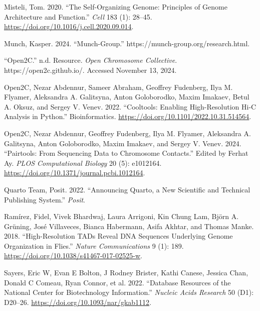 \documentclass[
  11pt,
  a4paper,
]{scrbook}
\newlength{\cslhangindent}
\newenvironment{CSLReferences}[2] %
 {\begin{list}{}{%
  \setlength{\itemindent}{0pt}
  \setlength{\leftmargin}{0pt}
  \setlength{\parsep}{0pt}
  \ifodd #1
   \setlength{\leftmargin}{\cslhangindent}
   \setlength{\itemindent}{-1\cslhangindent}
  \fi
  \setlength{\itemsep}{#2\baselineskip}}}
 {\end{list}}
\begin{document}
\begin{CSLReferences}{1}{0}
Misteli, Tom. 2020. {``The {Self-Organizing Genome}: {Principles} of
{Genome Architecture} and {Function}.''} \emph{Cell} 183 (1): 28--45.
\url{https://doi.org/10.1016/j.cell.2020.09.014}.

Munch, Kasper. 2024. {``Munch-Group.''}
https://munch-group.org/research.html.

{``{Open2C}.''} n.d. Resource. \emph{Open {Chromosome Collective}}.
https://open2c.github.io/. Accessed November 13, 2024.

Open2C, Nezar Abdennur, Sameer Abraham, Geoffrey Fudenberg, Ilya M.
Flyamer, Aleksandra A. Galitsyna, Anton Goloborodko, Maxim Imakaev,
Betul A. Oksuz, and Sergey V. Venev. 2022. {``Cooltools: Enabling
High-Resolution {Hi-C} Analysis in {Python}.''} Bioinformatics.
\url{https://doi.org/10.1101/2022.10.31.514564}.

Open2C, Nezar Abdennur, Geoffrey Fudenberg, Ilya M. Flyamer, Aleksandra
A. Galitsyna, Anton Goloborodko, Maxim Imakaev, and Sergey V. Venev.
2024. {``Pairtools: {From} Sequencing Data to Chromosome Contacts.''}
Edited by Ferhat Ay. \emph{PLOS Computational Biology} 20 (5): e1012164.
\url{https://doi.org/10.1371/journal.pcbi.1012164}.

Quarto Team, Posit. 2022. {``Announcing {Quarto}, a New Scientific and
Technical Publishing System.''} \emph{Posit}.

Ramírez, Fidel, Vivek Bhardwaj, Laura Arrigoni, Kin Chung Lam, Björn A.
Grüning, José Villaveces, Bianca Habermann, Asifa Akhtar, and Thomas
Manke. 2018. {``High-Resolution {TADs} Reveal {DNA} Sequences Underlying
Genome Organization in Flies.''} \emph{Nature Communications} 9 (1):
189. \url{https://doi.org/10.1038/s41467-017-02525-w}.

Sayers, Eric W, Evan E Bolton, J Rodney Brister, Kathi Canese, Jessica
Chan, Donald C Comeau, Ryan Connor, et al. 2022. {``Database Resources
of the National Center for Biotechnology Information.''} \emph{Nucleic
Acids Research} 50 (D1): D20--26.
\url{https://doi.org/10.1093/nar/gkab1112}.


\end{CSLReferences}
\end{document}

